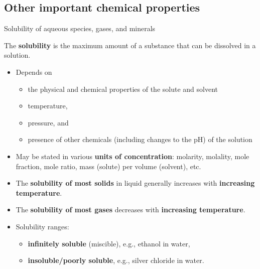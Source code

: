 \subsection{Other important chemical properties}
%
%
\begin{frame}{Solubility of aqueous species, gases, and minerals}

The \alert{\textbf{solubility}} is the maximum amount of a substance that can be dissolved in a solution. 

\begin{itemize}
	\pause
\item Depends on 
\begin{itemize}
\item the {physical and chemical properties of the solute and solvent} 
\item temperature, 
\item pressure, and 
\item presence of other chemicals (including changes to the pH) of the solution
\end{itemize}
%
\pause
\item May be stated in various \textbf{units of concentration}: molarity, molality, mole fraction, mole ratio, mass (solute) per volume (solvent), etc.
\pause
\item The \textbf{solubility of most solids} in liquid generally increases with \textbf{increasing temperature}.
\pause
\item The \textbf{solubility of most gases} decreases with \textbf{increasing temperature}. 
\pause
\item Solubility ranges:
%
\begin{itemize}
\item \textbf{infinitely soluble} (miscible), e.g., ethanol in water,
\item \textbf{insoluble/poorly soluble}, e.g., silver chloride in water.
\end{itemize}


\end{itemize}

\end{frame}
